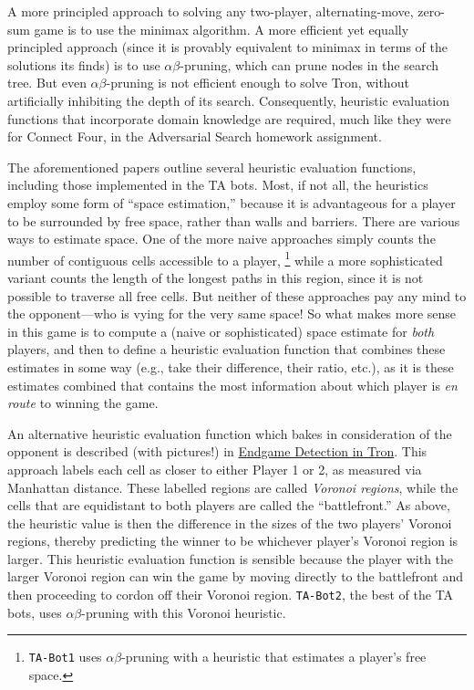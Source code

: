 \documentclass{article}
\begin{document}
A more principled approach to solving any two-player,
alternating-move, zero-sum game is to use the minimax algorithm.  A
more efficient yet equally principled approach (since it is provably
equivalent to minimax in terms of the solutions its finds) is to use
$\alpha\beta$-pruning, which can prune nodes in the search tree.
%
But even $\alpha\beta$-pruning is not efficient enough to solve Tron,
without artificially inhibiting the depth of its search.
Consequently, heuristic evaluation functions that incorporate domain
knowledge are required, much like they were for Connect Four, in the
Adversarial Search homework assignment.

The aforementioned papers outline several heuristic evaluation
functions, including those implemented in the TA bots.  Most, if not
all, the heuristics employ some form of ``space estimation,'' because
it is advantageous for a player to be surrounded by free space, rather
than walls and barriers.  There are various ways to estimate space.
One of the more naive approaches simply counts the number of
contiguous cells accessible to a player,%
\footnote{\texttt{TA-Bot1} uses $\alpha\beta$-pruning with a heuristic that
  estimates a player's free space.}  while a more sophisticated
variant counts the length of the longest paths in this region, since
it is not possible to traverse all free cells.  But neither of these
approaches pay any mind to the opponent---who is vying for the very
same space!  So what makes more sense in this game is to compute a
(naive or sophisticated) space estimate for \emph{both\/} players, and
then to define a heuristic evaluation function that combines these
estimates in some way (e.g., take their difference, their ratio,
etc.), as it is these estimates combined that contains the most
information about which player is \emph{en route\/} to winning the
game.

An alternative heuristic evaluation function which bakes in
consideration of the opponent is described (with pictures!) in
\href{https://project.dke.maastrichtuniversity.nl/games/files/bsc/Kang_Bsc-paper.pdf}{Endgame Detection in Tron}.
%
This approach labels each cell as closer to either Player 1 or 2, as
measured via Manhattan distance.  These labelled regions are called
\emph{Voronoi regions}, while the cells that are equidistant to both
players are called the ``battlefront.''  As above, the heuristic value
is then the difference in the sizes of the two players' Voronoi
regions, thereby predicting the winner to be whichever player's
Voronoi region is larger.  This heuristic evaluation function is
sensible because the player with the larger Voronoi region can win the
game by moving directly to the battlefront and then proceeding to
cordon off their Voronoi region.  \texttt{TA-Bot2}, the best of the TA
bots, uses $\alpha\beta$-pruning with this Voronoi heuristic.
\end{document}
